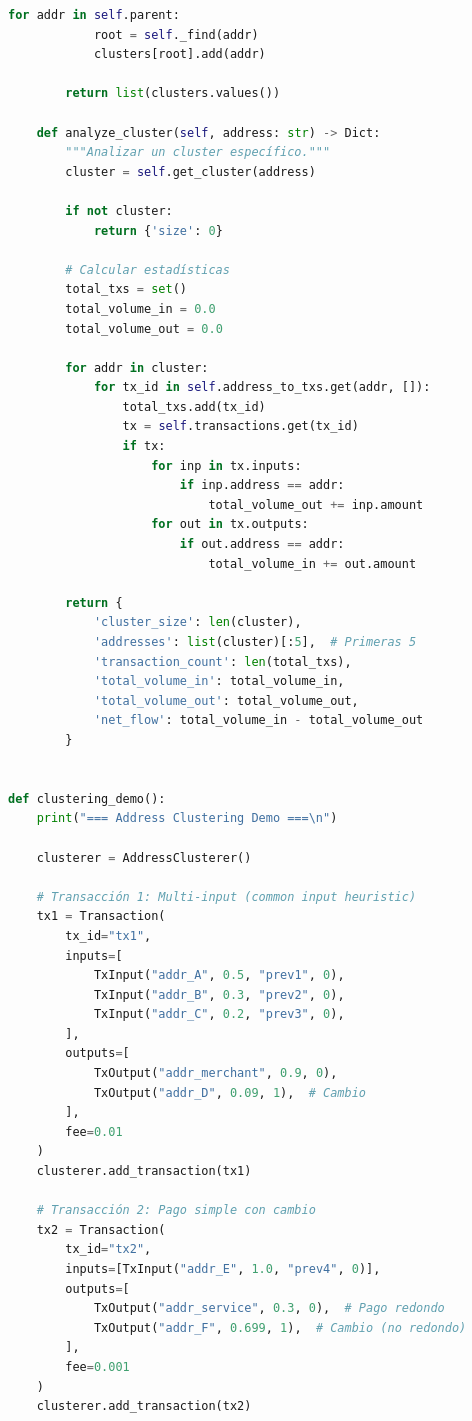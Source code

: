 \documentclass[11pt,a4paper,twoside]{book}
\theoremstyle{definition}
\theoremstyle{remark}
\begin{document}
\begin{lstlisting}[language=Python, caption={Sistema de Graph Analysis y Clustering}]
        for addr in self.parent:
            root = self._find(addr)
            clusters[root].add(addr)
        
        return list(clusters.values())
    
    def analyze_cluster(self, address: str) -> Dict:
        """Analizar un cluster específico."""
        cluster = self.get_cluster(address)
        
        if not cluster:
            return {'size': 0}
        
        # Calcular estadísticas
        total_txs = set()
        total_volume_in = 0.0
        total_volume_out = 0.0
        
        for addr in cluster:
            for tx_id in self.address_to_txs.get(addr, []):
                total_txs.add(tx_id)
                tx = self.transactions.get(tx_id)
                if tx:
                    for inp in tx.inputs:
                        if inp.address == addr:
                            total_volume_out += inp.amount
                    for out in tx.outputs:
                        if out.address == addr:
                            total_volume_in += out.amount
        
        return {
            'cluster_size': len(cluster),
            'addresses': list(cluster)[:5],  # Primeras 5
            'transaction_count': len(total_txs),
            'total_volume_in': total_volume_in,
            'total_volume_out': total_volume_out,
            'net_flow': total_volume_in - total_volume_out
        }


def clustering_demo():
    print("=== Address Clustering Demo ===\n")
    
    clusterer = AddressClusterer()
    
    # Transacción 1: Multi-input (common input heuristic)
    tx1 = Transaction(
        tx_id="tx1",
        inputs=[
            TxInput("addr_A", 0.5, "prev1", 0),
            TxInput("addr_B", 0.3, "prev2", 0),
            TxInput("addr_C", 0.2, "prev3", 0),
        ],
        outputs=[
            TxOutput("addr_merchant", 0.9, 0),
            TxOutput("addr_D", 0.09, 1),  # Cambio
        ],
        fee=0.01
    )
    clusterer.add_transaction(tx1)
    
    # Transacción 2: Pago simple con cambio
    tx2 = Transaction(
        tx_id="tx2",
        inputs=[TxInput("addr_E", 1.0, "prev4", 0)],
        outputs=[
            TxOutput("addr_service", 0.3, 0),  # Pago redondo
            TxOutput("addr_F", 0.699, 1),  # Cambio (no redondo)
        ],
        fee=0.001
    )
    clusterer.add_transaction(tx2)
    

\end{lstlisting}
\end{document}
